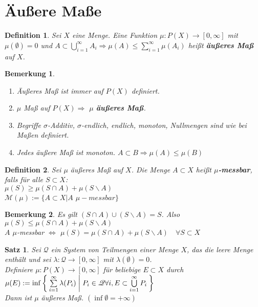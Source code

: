 \documentclass[11pt]{memoir}
\theoremstyle{changebreak}
\newtheorem{Definition}{Definition}[chapter]
\newtheorem{Bemerkung}{Bemerkung}[chapter]
\newtheorem{Satz}{Satz}[chapter]
\begin{document}
\section{Äußere Maße}

\begin{Definition}
Sei $X$ eine Menge. Eine Funktion $\mu: P(X) \rightarrow [0, \infty]$ mit $\mu(\emptyset) = 0$ und $A \subset \bigcup\limits_{i=1}^\infty A_i \Rightarrow \mu(A) \leq \sum\limits_{i=1}^\infty \mu(A_i)$ heißt \textbf{äußeres Maß} auf $X$.
\end{Definition}

\begin{Bemerkung}
\begin{enumerate}
	\item Äußeres Maß ist immer auf $P(X)$ definiert.
	\item $\mu$ Maß auf $P(X) \Rightarrow$ $\mu$ \textbf{äußeres Maß}.
	\item Begriffe $\sigma$-Additiv, $\sigma$-endlich, endlich, monoton, Nullmengen sind wie bei Maßen definiert.
	\item Jedes äußere Maß ist monoton. $A \subset B \Rightarrow \mu(A) \leq \mu(B)$
\end{enumerate}
\end{Bemerkung}

\begin{Definition}
Sei $\mu$ äußeres Maß auf $X$. Die Menge $A \subset X$ heißt \textbf{$\mu$-messbar}, falls für alle $S \subset X$: \\
$\mu(S) \geq \mu(S \cap A) + \mu(S \backslash A)$ \\
$\mathscr M(\mu):= \{ A \subset X | A$ $ \mu-messbar \}$
\end{Definition}

\begin{Bemerkung}
Es gilt $(S \cap A) \cup (S \backslash A) = S$. Also $\mu(S) \leq \mu(S \cap A) + \mu(S \backslash A)$ \\
$A$ $\mu$-messbar $\Leftrightarrow$ $\mu(S) = \mu(S \cap A) + \mu(S \backslash A)\quad \forall S \subset X$
\end{Bemerkung}

\begin{Satz}
Sei $\mathscr Q$ ein System von Teilmengen einer Menge $X$, das die leere Menge enthält und sei $\lambda: \mathscr Q \rightarrow [0, \infty]$ mit $\lambda(\emptyset) = 0$.\\
Definiere $\mu: P(X) \rightarrow [0, \infty]$ für beliebige $E \subset X$ durch \\
 $\mu(E) := \inf \Set{ \sum\limits_{i=1}^\infty \lambda(P_i) | P_i \in \mathscr Q \forall i, E \subset \bigcup\limits_{i=1}^\infty P_i }$ \\
Dann ist $\mu$ äußeres Maß. $(\inf \emptyset = + \infty)$
\end{Satz}
\end{document}
